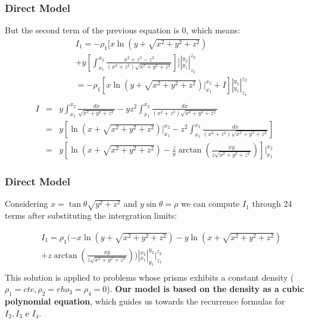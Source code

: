 \documentclass{beamer}
\begin{document}
\begin{frame}
\frametitle{Direct Model}
But the second term of the previous equation is 0, which means:
  \begin{eqnarray}
  && I_1 = -\rho_1 [ x{\ln {(y+ \sqrt{{x^2 + y^2 + z^2}})}} \nonumber \\ 
  &&+ y [ \int_{x_1}^{x_2} \frac{x^2+z^2 - z^2}{{(x^2+z^2) \sqrt{x^2 + y^2 + z^2}}} ]]|_{y_1}^{y_2}|_{z_1}^{z_2}  \nonumber \\
  && = -\rho_1 \left[ x{\ln {(y+ \sqrt{{x^2 + y^2 + z^2}})}}|_{x_1}^{x_2}  + I  \right]|_{y_1}^{y_2}|_{z_1}^{z_2} \nonumber \\
  \label{i3}
  \end{eqnarray}  
\begin{eqnarray}
I &=& y  \int_{x_1}^{x_2} \frac{dx}{\sqrt{x^2 + y^2 + z^2}} - yz^2 \int_{x_1}^{x_2} \frac{dx}{{(x^2+z^2) \sqrt{x^2 + y^2 + z^2}}} \nonumber \\ &=& y \left[ {\ln {(x+ \sqrt{{x^2 + y^2 + z^2}})}}|_{x_1}^{x_2}  - z^2 \int_{x_1}^{x_2} \frac{dx}{{(x^2+z^2) \sqrt{x^2 + y^2 + z^2}}}  \right] \nonumber \\
&=& y [ {\ln {(x+ \sqrt{{x^2 + y^2 + z^2}})}} - \frac{z}{y} \arctan{\left(\frac{xy}{z\sqrt{x^2 + y^2 + z^2}}\right)} ]|_{x_1}^{x_2}
\end{eqnarray}

\end{frame}

\begin{frame}
\frametitle{Direct Model}
Considering $x=\tan{\theta}\sqrt{y^2+z^2}$ and $y \sin{\theta}=\rho$ we can compute $I_1$ through 24 terms after substituting the intergration limits:

\begin{eqnarray}
&& I_1 = \rho_1 (- x{\ln {(y+ \sqrt{{x^2 + y^2 + z^2}})}}- y{\ln {(x+ \sqrt{{x^2 + y^2 + z^2}})}} \nonumber \\ 
 && + z\arctan{\left(\frac{xy}{z\sqrt{x^2 + y^2 + z^2}}\right)} )  |_{x_1}^{x_2}|_{y_1}^{y_2}|_{z_1}^{z_2} \nonumber \\
\end{eqnarray}
This solution is applied to problems whose prisms exhibits a constant density ($\rho_1 = cte, \rho_2=rho_3=\rho_4=0$).  \textbf{Our model is based on the density as a cubic polynomial equation}, which guides us towards the recurrence formulas for $I_2,I_3$ e $I_4$.
\end{frame}
\end{document}
